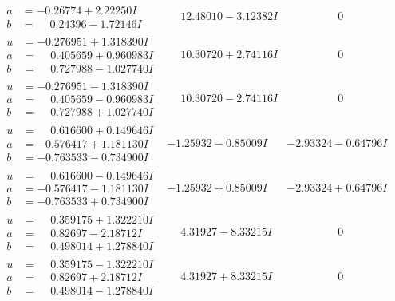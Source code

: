 \documentclass[1p]{elsarticle_modified}
\theoremstyle{definition}
\begin{document}
$$\begin{array}{c|c|c}
\begin{aligned}
a &= -0.26774 + 2.22250 I \\
b &= \phantom{-}0.24396 - 1.72146 I\end{aligned}
 & \phantom{-}12.48010 - 3.12382 I & \phantom{-0.000000 } 0 \\ \hline\begin{aligned}
u &= -0.276951 + 1.318390 I \\
a &= \phantom{-}0.405659 + 0.960983 I \\
b &= \phantom{-}0.727988 - 1.027740 I\end{aligned}
 & \phantom{-}10.30720 + 2.74116 I & \phantom{-0.000000 } 0 \\ \hline\begin{aligned}
u &= -0.276951 - 1.318390 I \\
a &= \phantom{-}0.405659 - 0.960983 I \\
b &= \phantom{-}0.727988 + 1.027740 I\end{aligned}
 & \phantom{-}10.30720 - 2.74116 I & \phantom{-0.000000 } 0 \\ \hline\begin{aligned}
u &= \phantom{-}0.616600 + 0.149646 I \\
a &= -0.576417 + 1.181130 I \\
b &= -0.763533 - 0.734900 I\end{aligned}
 & -1.25932 - 0.85009 I & -2.93324 - 0.64796 I \\ \hline\begin{aligned}
u &= \phantom{-}0.616600 - 0.149646 I \\
a &= -0.576417 - 1.181130 I \\
b &= -0.763533 + 0.734900 I\end{aligned}
 & -1.25932 + 0.85009 I & -2.93324 + 0.64796 I \\ \hline\begin{aligned}
u &= \phantom{-}0.359175 + 1.322210 I \\
a &= \phantom{-}0.82697 - 2.18712 I \\
b &= \phantom{-}0.498014 + 1.278840 I\end{aligned}
 & \phantom{-}4.31927 - 8.33215 I & \phantom{-0.000000 } 0 \\ \hline\begin{aligned}
u &= \phantom{-}0.359175 - 1.322210 I \\
a &= \phantom{-}0.82697 + 2.18712 I \\
b &= \phantom{-}0.498014 - 1.278840 I\end{aligned}
 & \phantom{-}4.31927 + 8.33215 I & \phantom{-0.000000 } 0\\

\end{array}$$
\end{document}

